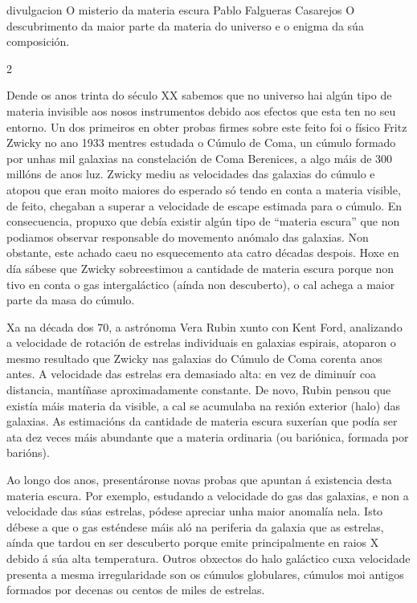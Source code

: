 \Titular%
{divulgacion}%
{O misterio da materia escura}%
{Pablo Falgueras Casarejos}%
{O descubrimento da maior parte da materia do universo e o enigma da súa composición.}%


\begin{multicols}{2}


Dende os anos trinta do século XX sabemos que no universo hai algún tipo de
materia invisible aos nosos instrumentos debido aos efectos que esta ten no seu
entorno. Un dos primeiros en obter probas firmes sobre este feito foi o físico
Fritz Zwicky no ano 1933 mentres estudada o Cúmulo de Coma, un cúmulo formado
por unhas mil galaxias na constelación de Coma Berenices, a algo máis de 300
millóns de anos luz. Zwicky mediu as velocidades das galaxias do cúmulo e
atopou que eran moito maiores do esperado só tendo en conta a materia visible,
de feito, chegaban a superar a velocidade de escape estimada para o cúmulo. En
consecuencia, propuxo que debía existir algún tipo de “materia escura” que non
podiamos observar responsable do movemento anómalo das galaxias. Non obstante,
este achado caeu no esquecemento ata catro décadas despois. Hoxe en día sábese
que Zwicky sobreestimou a cantidade de materia escura porque non tivo en conta
o gas intergaláctico (aínda non descuberto), o cal achega a maior parte da masa
do cúmulo. 

Xa na década dos 70, a astrónoma Vera Rubin xunto con Kent Ford, analizando a
velocidade de rotación de estrelas individuais en galaxias espirais, atoparon o
mesmo resultado que Zwicky nas galaxias do Cúmulo de Coma corenta anos antes. A
velocidade das estrelas era demasiado alta: en vez de diminuír coa distancia,
mantíñase aproximadamente constante. De novo, Rubin pensou que existía máis
materia da visible, a cal se acumulaba na rexión exterior (halo) das galaxias.
As estimacións da cantidade de materia escura suxerían que podía ser ata dez
veces máis abundante que a materia ordinaria (ou bariónica, formada por
barións).

Ao longo dos anos, presentáronse novas probas que apuntan á existencia desta
materia escura. Por exemplo, estudando a velocidade do gas das galaxias, e non
a velocidade das súas estrelas, pódese apreciar unha maior anomalía nela. Isto
débese a que o gas esténdese máis aló na periferia da galaxia que as estrelas,
aínda que tardou en ser descuberto porque emite principalmente en raios X
debido á súa alta temperatura. Outros obxectos do halo galáctico cuxa
velocidade presenta a mesma irregularidade son os cúmulos globulares, cúmulos
moi antigos formados por decenas ou centos de miles de estrelas.


\end{multicols}
